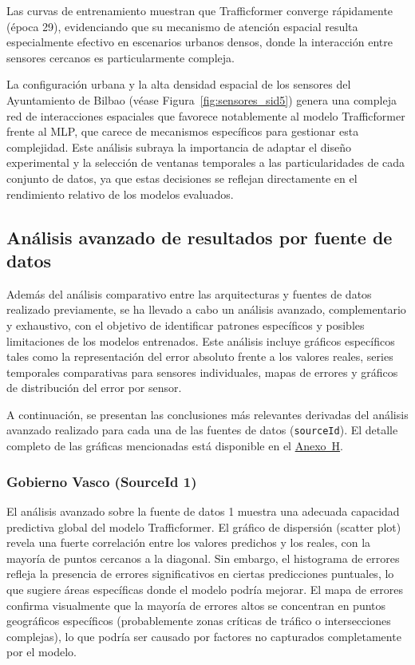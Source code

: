 Las curvas de entrenamiento muestran que Trafficformer converge rápidamente (época 29), evidenciando que su mecanismo de atención espacial resulta especialmente efectivo en escenarios urbanos densos, donde la interacción entre sensores cercanos es particularmente compleja.

La configuración urbana y la alta densidad espacial de los sensores del Ayuntamiento de Bilbao (véase Figura~\ref{fig:sensores_sid5}) genera una compleja red de interacciones espaciales que favorece notablemente al modelo Trafficformer frente al MLP, que carece de mecanismos específicos para gestionar esta complejidad. Este análisis subraya la importancia de adaptar el diseño experimental y la selección de ventanas temporales a las particularidades de cada conjunto de datos, ya que estas decisiones se reflejan directamente en el rendimiento relativo de los modelos evaluados.

\subsection{Análisis avanzado de resultados por fuente de datos}
\label{sec:analisis_avanzado_resultados}

Además del análisis comparativo entre las arquitecturas y fuentes de datos realizado previamente, se ha llevado a cabo un análisis avanzado, complementario y exhaustivo, con el objetivo de identificar patrones específicos y posibles limitaciones de los modelos entrenados. Este análisis incluye gráficos específicos tales como la representación del error absoluto frente a los valores reales, series temporales comparativas para sensores individuales, mapas de errores y gráficos de distribución del error por sensor.

A continuación, se presentan las conclusiones más relevantes derivadas del análisis avanzado realizado para cada una de las fuentes de datos (\texttt{sourceId}). El detalle completo de las gráficas mencionadas está disponible en el \hyperref[anexo:analisis_avanzado]{Anexo~H}.

\subsubsection*{Gobierno Vasco (SourceId 1)}
El análisis avanzado sobre la fuente de datos 1 muestra una adecuada capacidad predictiva global del modelo Trafficformer. El gráfico de dispersión (scatter plot) revela una fuerte correlación entre los valores predichos y los reales, con la mayoría de puntos cercanos a la diagonal. Sin embargo, el histograma de errores refleja la presencia de errores significativos en ciertas predicciones puntuales, lo que sugiere áreas específicas donde el modelo podría mejorar. El mapa de errores confirma visualmente que la mayoría de errores altos se concentran en puntos geográficos específicos (probablemente zonas críticas de tráfico o intersecciones complejas), lo que podría ser causado por factores no capturados completamente por el modelo.

